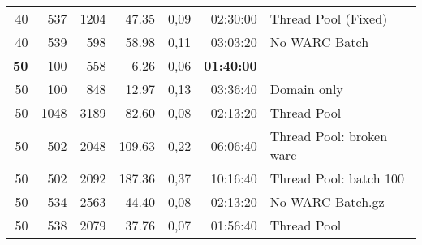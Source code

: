 \begin{table}[!ht]
\begin{tabular}{rrrrrrl}
    40           & 537          & 1204         & 47.35        & 0,09         & 02:30:00          & Thread Pool (Fixed)      \\
    40           & 539          & 598          & 58.98        & 0,11         & 03:03:20          & No WARC Batch            \\
    \textbf{50}  & 100          & 558          & 6.26         & 0,06         & \textbf{01:40:00} &                          \\
    50           & 100          & 848          & 12.97        & 0,13         & 03:36:40          & Domain only              \\
    50           & 1048         & 3189         & 82.60        & 0,08         & 02:13:20          & Thread Pool              \\
    50           & 502          & 2048         & 109.63       & 0,22         & 06:06:40          & Thread Pool: broken warc \\
    50           & 502          & 2092         & 187.36       & 0,37         & 10:16:40          & Thread Pool: batch 100   \\
    50           & 534          & 2563         & 44.40        & 0,08         & 02:13:20          & No WARC Batch.gz         \\
    50           & 538          & 2079         & 37.76        & 0,07         & 01:56:40          & Thread Pool              \\

\end{tabular}
\end{table}
